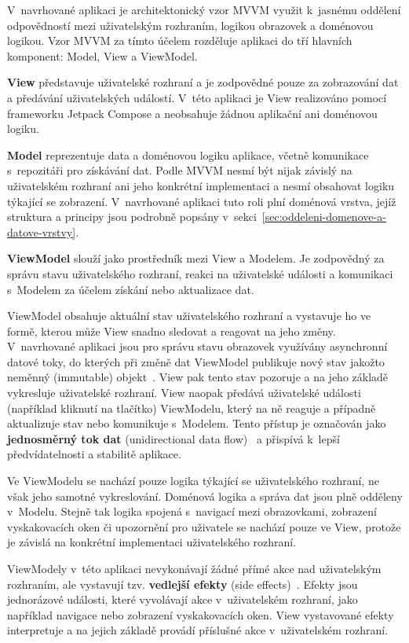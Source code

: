 V~navrhované aplikaci je architektonický vzor MVVM využit k~jasnému oddělení odpovědností mezi uživatelským rozhraním, logikou obrazovek a doménovou logikou.
Vzor MVVM za tímto účelem rozděluje aplikaci do tří hlavních komponent: Model, View a ViewModel.

\textbf{View} představuje uživatelské rozhraní a je zodpovědné pouze za zobrazování dat a předávání uživatelských událostí.
V~této aplikaci je View realizováno pomocí frameworku Jetpack Compose a neobsahuje žádnou aplikační ani doménovou logiku.

\textbf{Model} reprezentuje data a doménovou logiku aplikace, včetně komunikace s~repozitáři pro získávání dat.
Podle MVVM nesmí být nijak závislý na uživatelském rozhraní ani jeho konkrétní implementaci a nesmí obsahovat logiku týkající se zobrazení.
V~navrhované aplikaci tuto roli plní doménová vrstva, jejíž struktura a principy jsou podrobně popsány v~sekci~\ref{sec:oddeleni-domenove-a-datove-vrstvy}.

\textbf{ViewModel} slouží jako prostředník mezi View a Modelem.
Je zodpovědný za správu stavu uživatelského rozhraní, reakci na uživatelské události a komunikaci s~Modelem za účelem získání nebo aktualizace dat.

ViewModel obsahuje aktuální stav uživatelského rozhraní a vystavuje ho ve formě, kterou může View snadno sledovat a reagovat na jeho změny.
V~navrhované aplikaci jsou pro správu stavu obrazovek využívány asynchronní datové toky, do kterých při změně dat ViewModel publikuje nový stav jakožto neměnný (immutable) objekt~\parencite{compose_ui_architecture}.
View pak tento stav pozoruje a na jeho základě vykresluje uživatelské rozhraní.
View naopak předává uživatelské události (například kliknutí na tlačítko) ViewModelu, který na ně reaguje a případně aktualizuje stav nebo komunikuje s~Modelem.
Tento přístup je označován jako \textbf{jednosměrný tok dat} (unidirectional data flow)~\parencite{android_recommended_architecture} a přispívá k~lepší předvídatelnosti a stabilitě aplikace.

Ve ViewModelu se nachází pouze logika týkající se uživatelského rozhraní, ne však jeho samotné vykreslování.
Doménová logika a správa dat jsou plně odděleny v~Modelu.
Stejně tak logika spojená s~navigací mezi obrazovkami, zobrazení vyskakovacích oken či upozornění pro uživatele se nachází pouze ve View, protože je závislá na konkrétní implementaci uživatelského rozhraní.

ViewModely v~této aplikaci nevykonávají žádné přímé akce nad uživatelským rozhraním, ale vystavují tzv. \textbf{vedlejší efekty} (side effects)~\parencite{android_side_effect}.
Efekty jsou jednorázové události, které vyvolávají akce v~uživatelském rozhraní, jako například navigace nebo zobrazení vyskakovacích oken.
View vystavované efekty interpretuje a na jejich základě provádí příslušné akce v~uživatelském rozhraní.

